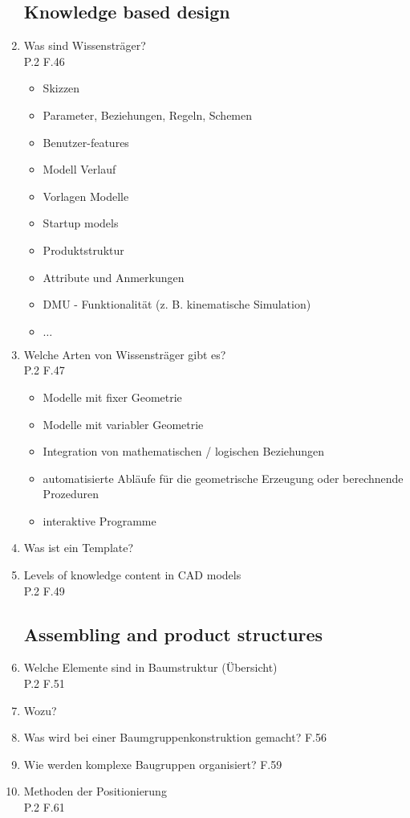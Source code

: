 \documentclass[10pt,a4paper,fleqn]{article}
\begin{document}
\begin{enumerate}
\subsection{Knowledge based design}
	\item Was sind Wissensträger?\\
		P.2 F.46
		\begin{itemize}
			\item Skizzen
			\item Parameter, Beziehungen, Regeln, Schemen
			\item Benutzer-features
			\item Modell Verlauf
			\item Vorlagen Modelle
			\item Startup models
			\item Produktstruktur
			\item Attribute und Anmerkungen
			\item DMU - Funktionalität (z. B. kinematische Simulation)
			\item $\dots$
		\end{itemize}
	\item Welche Arten von Wissensträger gibt es?\\
		P.2 F.47
		\begin{itemize}
			\item Modelle mit fixer Geometrie
			\item Modelle mit variabler Geometrie
			\item Integration von mathematischen / logischen Beziehungen
			\item automatisierte Abläufe für die geometrische Erzeugung oder berechnende Prozeduren
			\item interaktive Programme
		\end{itemize}
	\item Was ist ein Template?
	\item Levels of knowledge content in CAD models\\
		P.2 F.49
\subsection{Assembling and product structures}
	\item Welche Elemente sind in Baumstruktur (Übersicht)\\
		P.2 F.51
	\item Wozu?
	\item Was wird bei einer Baumgruppenkonstruktion gemacht? F.56
	\item Wie werden komplexe Baugruppen organisiert? F.59
	\item Methoden der Positionierung\\
		P.2 F.61

\end{enumerate}
\end{document}
